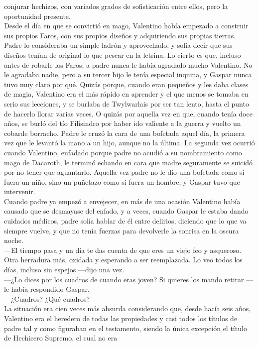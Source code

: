 \documentclass[
  letterpaper,
]{krantz}
\begin{document}
conjurar hechizos, con variados grados de sofisticación entre ellos,
pero la oportunidad presente.\\
Desde el día en que se convirtió en mago, Valentino había empezado a
construir sus propios Faros, con sus propios diseños y adquiriendo sus
propias tierras. Padre lo consideraba un simple ladrón y aprovechado, y
solía decir que sus diseños tenían de original lo que pescar en la
letrina. Lo cierto es que, incluso antes de robarle los Faros, a padre
nunca le había agradado mucho Valentino. No le agradaba nadie, pero a su
tercer hijo le tenía especial inquina, y Gaspar nunca tuvo muy claro por
qué. Quizás porque, cuando eran pequeños y les daba clases de magia,
Valentino era el más rápido en aprender y el que menos se tomaba en
serio sus lecciones, y se burlaba de Twylwarlais por ser tan lento,
hasta el punto de hacerlo llorar varias veces. O quizás por aquella vez
en que, cuando tenía doce años, se burló del tío Filisindro por haber
ido valiente a la guerra y vuelto un cobarde borracho. Padre le cruzó la
cara de una bofetada aquel día, la primera vez que le levantó la mano a
un hijo, aunque no la última. La segunda vez ocurrió cuando Valentino,
enfadado porque padre no acudió a su nombramiento como mago de Dacaroth,
le terminó echando en cara que madre seguramente se suicidó por no tener
que aguantarlo. Aquella vez padre no le dio una bofetada como si fuera
un niño, sino un puñetazo como si fuera un hombre, y Gaspar tuvo que
intervenir.\\
Cuando padre ya empezó a envejecer, en más de una ocasión Valentino
había causado que se desmayase del enfado, y a veces, cuando Gaspar le
estaba dando cuidados médicos, padre solía hablar de él entre delirios,
diciendo que lo que va siempre vuelve, y que no tenía fuerzas para
devolverle la sonrisa en la oscura noche.\\
---El tiempo pasa y un día te das cuenta de que eres un viejo feo y
asqueroso. Otra herradura más, oxidada y esperando a ser reemplazada. Lo
veo todos los días, incluso sin espejos ---dijo una vez.\\
---¿Lo dices por los cuadros de cuando eras joven? Si quieres los mando
retirar ---le había respondido Gaspar.\\
---¿Cuadros? ¿Qué cuadros?\\
La situación era cien veces más absurda considerando que, desde hacía
seis años, Valentino era el heredero de todas las propiedades y casi
todos los títulos de padre tal y como figuraban en el testamento, siendo
la única excepción el título de Hechicero Supremo, el cual no era
\end{document}
